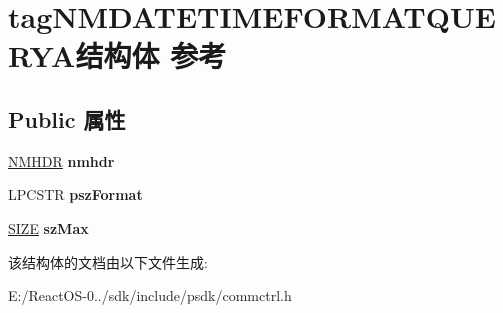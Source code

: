 \hypertarget{structtag_n_m_d_a_t_e_t_i_m_e_f_o_r_m_a_t_q_u_e_r_y_a}{}\section{tag\+N\+M\+D\+A\+T\+E\+T\+I\+M\+E\+F\+O\+R\+M\+A\+T\+Q\+U\+E\+R\+Y\+A结构体 参考}
\label{structtag_n_m_d_a_t_e_t_i_m_e_f_o_r_m_a_t_q_u_e_r_y_a}
\subsection*{Public 属性}
\begin{DoxyCompactItemize}
\item 
\mbox{\label{structtag_n_m_d_a_t_e_t_i_m_e_f_o_r_m_a_t_q_u_e_r_y_a_aea6b4bd0b50cf0823314644ab4d1be6b}} 
\hyperlink{structtag_n_m_h_d_r}{N\+M\+H\+DR} {\bfseries nmhdr}
\item 
\mbox{\label{structtag_n_m_d_a_t_e_t_i_m_e_f_o_r_m_a_t_q_u_e_r_y_a_a2f689c67a762fc09b5f233aced91507c}} 
L\+P\+C\+S\+TR {\bfseries psz\+Format}
\item 
\mbox{\label{structtag_n_m_d_a_t_e_t_i_m_e_f_o_r_m_a_t_q_u_e_r_y_a_ac36500a9422f4cc55a3fd78cd85be102}} 
\hyperlink{structtag_s_i_z_e}{S\+I\+ZE} {\bfseries sz\+Max}
\end{DoxyCompactItemize}


该结构体的文档由以下文件生成\+:\begin{DoxyCompactItemize}
\item 
E\+:/\+React\+O\+S-\/0../sdk/include/psdk/commctrl.\+h\end{DoxyCompactItemize}
